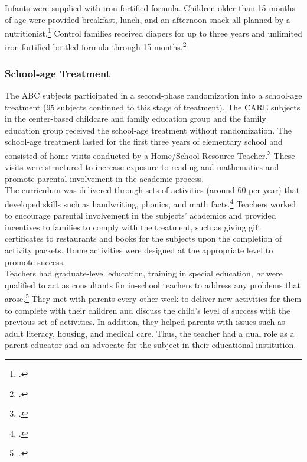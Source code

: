 \begin{appendices}
\noindent Infants were supplied with iron-fortified formula. Children older than 15 months of age were provided breakfast, lunch, and an
afternoon snack all planned by a nutritionist.\footnote{\citet{Bryant_et_al_1987_Carolina_Approach_TIECSE, Campbell_Conti_etal_2014_EarlyChildhoodInvestments,abc2014-2015interviews}.} Control families received diapers for up to three years and unlimited iron-fortified bottled formula through 15 months.\footnote{\citet{Ramey_Collier_etal_1976_CarolinaAbecedarianProject,Ramey_Campbell_1979_SR, Ramey_etal_1985_Project-CARE_TiECSE}.}

\subsubsection{School-age Treatment}

\noindent The ABC subjects participated in a second-phase randomization into a school-age treatment (95 subjects continued to this stage of treatment). The CARE subjects in the center-based childcare and family education group and the family education group received the school-age treatment without randomization. The school-age treatment lasted for the first three years of elementary school and consisted of home visits conducted by a Home/School Resource Teacher.\footnote{\cite{Burchinal_Campbell_etal_1997_CD}.} These visits were structured to increase exposure to reading and mathematics and promote parental involvement in the academic process.\\

\noindent The curriculum was delivered through sets of activities (around 60 per year) that developed skills such as handwriting, phonics, and math facts.\footnote{\cite{Campbell-Ramey_1989_Preschool-vs-School-age}.} Teachers worked to encourage parental involvement in the subjects' academics and provided incentives to families to comply with the treatment, such as giving gift certificates to restaurants and books for the subjects upon the completion of activity packets. Home activities were designed at the appropriate level to promote success.\\

\noindent Teachers had graduate-level education, training in special education, \textit{or} were qualified to act as consultants for in-school teachers to address any problems that arose.\footnote{\cite{Ramey_Campbell_1991_childreninpoverty}.} They met with parents every other week to deliver new activities for them to complete with their children and discuss the child's level of success with the previous set of activities. In addition, they helped parents with issues such as adult literacy, housing, and medical care. Thus, the teacher had a dual role as a parent educator and an advocate for the subject in their educational institution.


\end{appendices}
